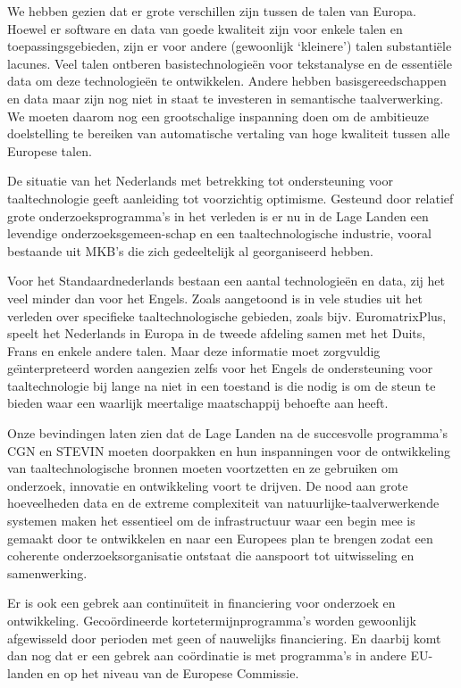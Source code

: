\documentclass[]{../../metanetpaper}
\begin{document}
\begin{multicols}{2}
    We hebben gezien dat er grote verschillen zijn tussen de talen van Europa. Hoewel er software en data van goede kwaliteit zijn voor enkele talen en toepassingsgebieden, zijn er voor andere (gewoonlijk `kleinere') talen substanti{\"e}le lacunes. Veel talen ontberen basistechnologie{\"e}n voor tekstanalyse en de essenti{\"e}le data om deze technologie{\"e}n te ontwikkelen. Andere hebben basisgereedschappen en data maar zijn nog niet in staat te investeren in semantische taalverwerking. We moeten daarom nog een grootschalige inspanning doen om de ambitieuze doelstelling te bereiken van automatische vertaling van hoge kwaliteit tussen alle Europese talen.

    De situatie van het Nederlands met betrekking tot ondersteuning voor taaltechnologie geeft aanleiding tot voorzichtig optimisme. Gesteund door relatief grote onderzoeksprogramma's in het verleden is er nu in de Lage Landen een levendige onderzoeksgemeen-schap en een taaltechnologische industrie, vooral bestaande uit MKB's die zich gedeeltelijk al georganiseerd hebben.

    Voor het Standaardnederlands bestaan een aantal technologie{\"e}n en data, zij het veel minder dan voor het Engels. Zoals aangetoond is in vele studies uit het verleden over specifieke taaltechnologische gebieden, zoals bijv. EuromatrixPlus, speelt het Nederlands in Europa in de tweede afdeling samen met het Duits, Frans en enkele andere talen. Maar deze informatie moet zorgvuldig ge{\"\i}nterpreteerd worden aangezien zelfs voor het Engels de ondersteuning voor taaltechnologie bij lange na niet in een toestand is die nodig is om de steun te bieden waar een waarlijk meertalige maatschappij behoefte aan heeft.

    Onze bevindingen laten zien dat de Lage Landen na de succesvolle programma's CGN en STEVIN moeten doorpakken en hun inspanningen voor de ontwikkeling van taaltechnologische bronnen moeten voortzetten en ze gebruiken om onderzoek, innovatie en ontwikkeling voort te drijven. De nood aan grote hoeveelheden data en de extreme complexiteit van natuurlijke-taalverwerkende systemen maken het essentieel om de infrastructuur waar een begin mee is gemaakt door te ontwikkelen en naar een Europees plan te brengen zodat een coherente onderzoeksorganisatie ontstaat die aanspoort tot uitwisseling en samenwerking.

    Er is ook een gebrek aan continu{\"\i}teit in financiering voor onderzoek en ontwikkeling. Geco{\"o}rdineerde kortetermijnprogramma's worden gewoonlijk afgewisseld door perioden met geen of nauwelijks financiering. En daarbij komt dan nog dat er een gebrek aan co{\"o}rdinatie is met programma's in andere EU-landen en op het niveau van de Europese Commissie.


\end{multicols}
\end{document}
